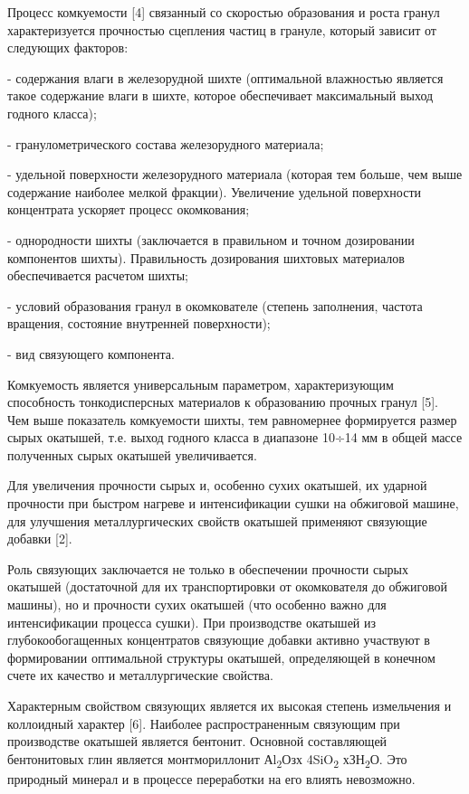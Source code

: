\begin{multicols}{2}
Процесс комкуемости {[}4{]} связанный со скоростью образования и роста
гранул характеризуется прочностью сцепления частиц в грануле, который
зависит от следующих факторов:

- содержания влаги в железорудной шихте (оптимальной влажностью является
такое содержание влаги в шихте, которое обеспечивает максимальный выход
годного класса);

- гранулометрического состава железорудного материала;

- удельной поверхности железорудного материала (которая тем больше, чем
выше содержание наиболее мелкой фракции). Увеличение удельной
поверхности концентрата ускоряет процесс окомкования;

- однородности шихты (заключается в правильном и точном дозировании
компонентов шихты). Правильность дозирования шихтовых материалов
обеспечивается расчетом шихты;

- условий образования гранул в окомкователе (степень заполнения, частота
вращения, состояние внутренней поверхности);

- вид связующего компонента.

Комкуемость является универсальным параметром, характеризующим
способность тонкодисперсных материалов к образованию прочных гранул
{[}5{]}. Чем выше показатель комкуемости шихты, тем равномернее
формируется размер сырых окатышей, т.е. выход годного класса в диапазоне
10÷14 мм в общей массе полученных сырых окатышей увеличивается.

Для увеличения прочности сырых и, особенно сухих окатышей, их ударной
прочности при быстром нагреве и интенсификации сушки на обжиговой
машине, для улучшения металлургических свойств окатышей применяют
связующие добавки {[}2{]}.

Роль связующих заключается не только в обеспечении прочности сырых
окатышей (достаточной для их транспортировки от окомкователя до
обжиговой машины), но и прочности сухих окатышей (что особенно важно для
интенсификации процесса сушки). При производстве окатышей из
глубокообогащенных концентратов связующие добавки активно участвуют в
формировании оптимальной структуры окатышей, определяющей в конечном
счете их качество и металлургические свойства.

Характерным свойством связующих является их высокая степень измельчения
и коллоидный характер {[}6{]}. Наиболее распространенным связующим при
производстве окатышей является бентонит. Основной составляющей
бентонитовых глин является монтмориллонит Аl\textsubscript{2}Озх
4SiO\textsubscript{2} хЗН\textsubscript{2}О. Это природный минерал и в
процессе переработки на его влиять невозможно.


\end{multicols}
